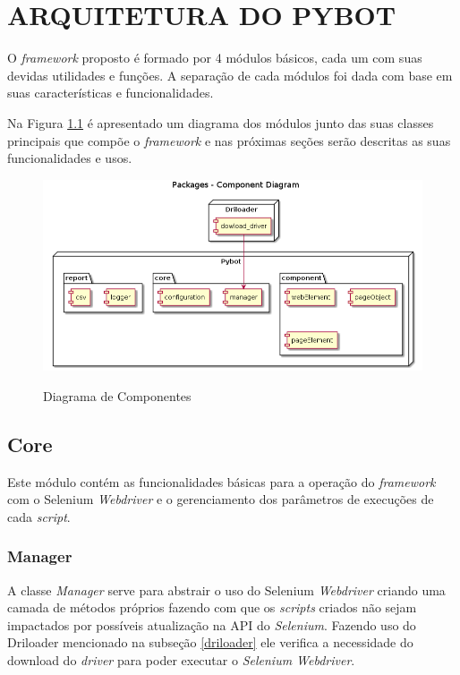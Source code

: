 %
%
\chapter{ARQUITETURA DO PYBOT}\label{chap:imp}
    O \textit{framework} proposto é formado por 4 módulos básicos, cada um com suas devidas utilidades e funções.
    A separação de cada módulos foi dada com base em suas características e funcionalidades.

    Na Figura \ref{fig:modules} é apresentado um diagrama dos módulos junto das suas classes principais que compõe o
    \textit{framework} e nas próximas seções serão descritas as suas funcionalidades e usos.


    \begin{figure}[H]
        \vspace*{0,3cm}
        \centering
        \caption{Diagrama de Componentes}
        \includegraphics[width=1\textwidth]{./04-figuras/model}
        \label{fig:modules}
    \end{figure}

    \section{Core}
        Este módulo contém as funcionalidades básicas para a operação do \textit{framework} com o Selenium \textit{Webdriver}
        e o gerenciamento dos parâmetros de execuções de cada \textit{script}.

        \subsection{Manager} \label{sec:manager}
        A classe \textit{Manager} serve para abstrair o uso do Selenium \textit{Webdriver} criando uma camada de métodos próprios fazendo com que os \textit{scripts}
        criados não sejam impactados por possíveis atualização na API do \textit{Selenium}. Fazendo uso do Driloader mencionado na
        subseção \ref{driloader} ele verifica a necessidade do download do \textit{driver} para poder executar o \textit{Selenium Webdriver}.

